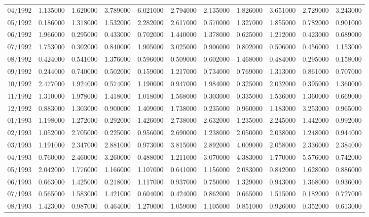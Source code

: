 \begin{tabular}{lrrrrrrrrrr}
04/1992 & 1.135000 & 1.620000 & 3.789000 & 6.021000 & 2.794000 & 2.135000 & 1.826000 & 3.651000 & 2.729000 & 3.243000 \\
05/1992 & 0.186000 & 1.318000 & 1.532000 & 2.282000 & 2.617000 & 0.570000 & 1.327000 & 1.855000 & 0.782000 & 0.901000 \\
06/1992 & 1.966000 & 0.295000 & 0.433000 & 0.702000 & 1.440000 & 1.378000 & 0.625000 & 1.212000 & 0.423000 & 0.689000 \\
07/1992 & 1.753000 & 0.302000 & 0.840000 & 1.905000 & 3.025000 & 0.906000 & 0.802000 & 0.506000 & 0.456000 & 1.153000 \\
08/1992 & 0.424000 & 0.541000 & 1.376000 & 0.596000 & 0.509000 & 0.602000 & 1.468000 & 0.484000 & 0.295000 & 0.158000 \\
09/1992 & 0.244000 & 0.740000 & 0.502000 & 0.159000 & 1.217000 & 0.734000 & 0.769000 & 1.313000 & 0.861000 & 0.707000 \\
10/1992 & 2.477000 & 1.924000 & 0.574000 & 1.190000 & 0.947000 & 1.984000 & 0.325000 & 2.032000 & 0.395000 & 1.360000 \\
11/1992 & 1.310000 & 1.978000 & 1.418000 & 1.018000 & 1.568000 & 0.303000 & 0.335000 & 1.536000 & 1.360000 & 0.669000 \\
12/1992 & 0.883000 & 1.303000 & 0.900000 & 1.409000 & 1.738000 & 0.235000 & 0.960000 & 1.183000 & 3.253000 & 0.965000 \\
01/1993 & 1.198000 & 1.272000 & 0.292000 & 1.426000 & 2.738000 & 2.632000 & 1.235000 & 2.245000 & 1.442000 & 0.992000 \\
02/1993 & 1.052000 & 2.705000 & 0.225000 & 0.956000 & 2.690000 & 1.238000 & 2.050000 & 2.038000 & 1.248000 & 0.944000 \\
03/1993 & 1.191000 & 2.347000 & 2.881000 & 0.973000 & 3.815000 & 2.892000 & 4.009000 & 2.058000 & 2.336000 & 2.384000 \\
04/1993 & 0.760000 & 2.460000 & 3.260000 & 0.488000 & 1.211000 & 3.070000 & 4.383000 & 1.770000 & 5.576000 & 0.742000 \\
05/1993 & 2.042000 & 1.776000 & 1.166000 & 1.107000 & 0.641000 & 1.156000 & 2.083000 & 0.842000 & 1.628000 & 0.886000 \\
06/1993 & 0.663000 & 1.425000 & 0.218000 & 1.117000 & 0.937000 & 0.750000 & 1.329000 & 0.943000 & 1.368000 & 0.936000 \\
07/1993 & 0.565000 & 1.583000 & 1.421000 & 0.604000 & 0.424000 & 0.862000 & 0.665000 & 1.515000 & 0.182000 & 0.727000 \\
08/1993 & 1.423000 & 0.987000 & 0.464000 & 1.270000 & 1.059000 & 1.105000 & 0.851000 & 0.926000 & 0.352000 & 0.613000 \\

\end{tabular}
